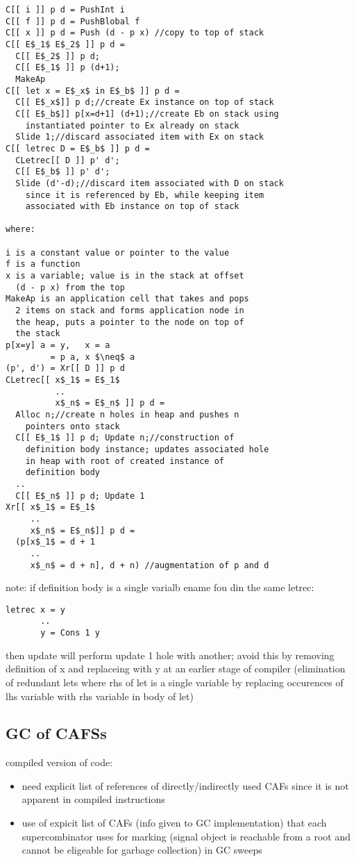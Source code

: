 \documentclass[8pt]{extarticle}
\begin{document}
\begin{multicols*}{2}
\begin{lstlisting}
C[[ i ]] p d = PushInt i
C[[ f ]] p d = PushBlobal f
C[[ x ]] p d = Push (d - p x) //copy to top of stack
C[[ E$_1$ E$_2$ ]] p d =
  C[[ E$_2$ ]] p d;
  C[[ E$_1$ ]] p (d+1);
  MakeAp
C[[ let x = E$_x$ in E$_b$ ]] p d =
  C[[ E$_x$]] p d;//create Ex instance on top of stack
  C[[ E$_b$]] p[x=d+1] (d+1);//create Eb on stack using
    instantiated pointer to Ex already on stack
  Slide 1;//discard associated item with Ex on stack
C[[ letrec D = E$_b$ ]] p d =
  CLetrec[[ D ]] p' d';
  C[[ E$_b$ ]] p' d';
  Slide (d'-d);//discard item associated with D on stack
    since it is referenced by Eb, while keeping item
    associated with Eb instance on top of stack

where:

i is a constant value or pointer to the value
f is a function
x is a variable; value is in the stack at offset
  (d - p x) from the top
MakeAp is an application cell that takes and pops
  2 items on stack and forms application node in
  the heap, puts a pointer to the node on top of
  the stack
p[x=y] a = y,   x = a
         = p a, x $\neq$ a
(p', d') = Xr[[ D ]] p d
CLetrec[[ x$_1$ = E$_1$
          ..
          x$_n$ = E$_n$ ]] p d =
  Alloc n;//create n holes in heap and pushes n
    pointers onto stack
  C[[ E$_1$ ]] p d; Update n;//construction of
    definition body instance; updates associated hole
    in heap with root of created instance of
    definition body
  ..
  C[[ E$_n$ ]] p d; Update 1
Xr[[ x$_1$ = E$_1$
     ..
     x$_n$ = E$_n$]] p d =
  (p[x$_1$ = d + 1
     ..
     x$_n$ = d + n], d + n) //augmentation of p and d
\end{lstlisting}

note: if definition body is a single varialb ename fou din the same letrec:
\begin{lstlisting}
letrec x = y
       ..
       y = Cons 1 y
\end{lstlisting}
then update will perform update 1 hole with another; avoid this by removing definition of x and replaceing with y at an earlier stage of compiler (elimination of  redundant lets where rhs of let is a single variable by replacing occurences of lhs variable with rhs variable in body of let)

\subsection{GC of CAFSs}
compiled version of code:
\begin{itemize}
\item need explicit list of references of directly/indirectly used CAFs since it is not apparent in compiled instructions
\item use of expicit list of CAFs (info given to GC implementation) that each supercombinator uses for marking (signal object is reachable from a root and cannot be eligeable for garbage collection) in GC sweeps
\end{itemize}


\end{multicols*}
\end{document}
